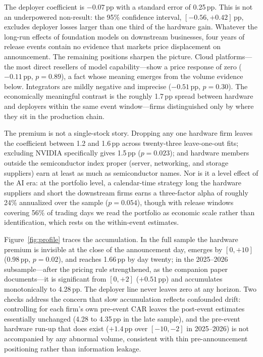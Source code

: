 \documentclass[review,12pt,authoryear]{elsarticle}
\newcommand{\pp}{\,pp}
\begin{document}
The deployer coefficient is $-0.07$\pp{} with a standard error of 0.25\pp{}.
This is not an underpowered non-result: the 95\% confidence interval,
$[-0.56,+0.42]$\pp{}, excludes deployer losses larger than one third of the
hardware gain. Whatever the long-run effects of foundation models on
downstream businesses, four years of release events contain no evidence that
markets price displacement on announcement. The remaining positions sharpen
the picture. Cloud platforms---the most direct resellers of model
capability---show a price response of zero ($-0.11$\pp{}, $p=0.89$), a fact
whose meaning emerges from the volume evidence below. Integrators are mildly
negative and imprecise ($-0.51$\pp{}, $p=0.30$). The economically meaningful
contrast is the roughly 1.7\pp{} spread between hardware and deployers
within the same event window---firms distinguished only by where they sit in
the production chain.

The premium is not a single-stock story. Dropping any one hardware firm
leaves the coefficient between 1.2 and 1.6\pp{} across twenty-three
leave-one-out fits; excluding NVIDIA specifically gives 1.5\pp{}
($p=0.023$); and hardware members outside the semiconductor index proper
(server, networking, and storage suppliers) earn at least as much as
semiconductor names. Nor is it a level effect of the AI era: at the
portfolio level, a calendar-time strategy long the hardware suppliers and
short the downstream firms earns a three-factor alpha of roughly 24\%
annualized over the sample ($p=0.054$), though with release windows covering
56\% of trading days we read the portfolio as economic scale rather than
identification, which rests on the within-event estimates.

Figure~\ref{fig:profile} traces the accumulation. In the full sample the
hardware premium is invisible at the close of the announcement day, emerges
by $[0,+10]$ (0.98\pp{}, $p=0.02$), and reaches 1.66\pp{} by day twenty; in
the 2025--2026 subsample---after the pricing rule strengthened, as the
companion paper documents---it is significant from $[0,+2]$ ($+0.51$\pp{})
and accumulates monotonically to 4.28\pp{}. The deployer line never leaves
zero at any horizon. Two checks address the concern that slow accumulation
reflects confounded drift: controlling for each firm's own pre-event CAR
leaves the post-event estimates essentially unchanged (4.28 to 4.35\pp{} in
the late sample), and the pre-event hardware run-up that does exist
($+1.4$\pp{} over $[-10,-2]$ in 2025--2026) is not accompanied by any
abnormal volume, consistent with thin pre-announcement positioning rather
than information leakage.
\end{document}
